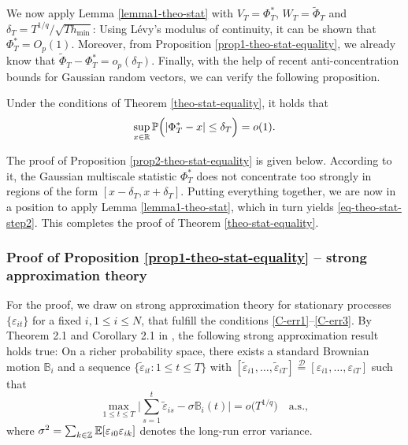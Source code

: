 \documentclass[a4paper,12pt]{article}
\numberwithin{equation}{section}
\begin{document}
We now apply Lemma \ref{lemma1-theo-stat} with $V_T = \Phi^*_T$, $W_T = \widetilde{\Phi}_T$ and $\delta_T = T^{1/q} / \sqrt{T h_{\min}}$: Using L{\'e}vy's modulus of continuity, it can be shown that $\Phi_T^* = O_p(1)$. Moreover, from Proposition \ref{prop1-theo-stat-equality}, we already know that $\widetilde{\Phi}_T - \Phi_T^* = o_p(\delta_T)$. Finally, with the help of recent anti-concentration bounds for Gaussian random vectors, we can verify the following proposition.
\begin{propA}\label{prop2-theo-stat-equality}
Under the conditions of Theorem \ref{theo-stat-equality}, it holds that 
\[ \sup_{x \in \mathbb{R}} \mathbb{P} \Big( | \Phi_T^* - x | \le \delta_T \Big) = o(1). \]
\end{propA}
The proof of Proposition \ref{prop2-theo-stat-equality} is given below. According to it, the Gaussian multiscale statistic $\Phi_T^*$ does not concentrate too strongly in regions of the form $[x - \delta_T,x + \delta_T]$. Putting everything together, we are now in a position to apply Lemma \ref{lemma1-theo-stat}, which in turn yields \eqref{eq-theo-stat-step2}. This completes the proof of Theorem \ref{theo-stat-equality}. 



\subsubsection*{Proof of Proposition \ref{prop1-theo-stat-equality} -- strong approximation theory}


For the proof, we draw on strong approximation theory for stationary processes $\{\varepsilon_{it}\}$ for a fixed $i, 1\le i \le N$, that fulfill the conditions \ref{C-err1}--\ref{C-err3}. By Theorem 2.1 and Corollary 2.1 in \cite{BerkesLiuWu2014}, the following strong approximation result holds true: On a richer probability space, there exists a standard Brownian motion $\mathbb{B}_i$ and a sequence $\{ \widetilde{\varepsilon}_{it}: 1 \le t \le T \}$ with $[\widetilde{\varepsilon}_{i1},\ldots,\widetilde{\varepsilon}_{iT}] \stackrel{\mathcal{D}}{=} [\varepsilon_{i1},\ldots,\varepsilon_{iT}]$ such that 
\begin{equation}\label{eq-strongapprox-equality-dep}
\max_{1 \le t \le T} \Big| \sum\limits_{s=1}^t \widetilde{\varepsilon}_{is} - \sigma \mathbb{B}_i(t) \Big| = o\big( T^{1/q} \big) \quad \text{a.s.},  
\end{equation}
where $\sigma^2 = \sum_{k \in \mathbb{Z}} \mathbb{E}[\varepsilon_{i0} \varepsilon_{ik}]$ denotes the long-run error variance.
\end{document}
